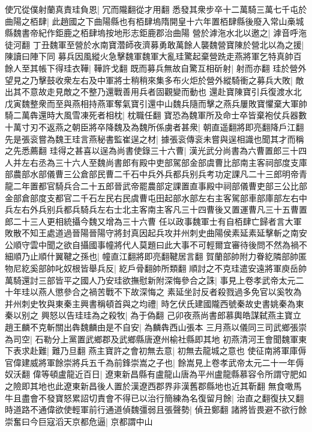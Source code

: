 使冗從僕射蘭真責珪負恩|{
	冗而隴翻從才用翻}
悉發其衆步卒十二萬騎三萬七千屯於曲陽之栢肆|{
	此趙國之下曲陽縣也有栢肆塢隋開皇十六年置栢肆縣後廢入常山槀城縣魏書帝紀作鉅鹿之栢肆塢按地形志鉅鹿郡治曲陽}
營於滹沲水北以邀之|{
	滹音呼沲徒河翻}
丁丑魏軍至營於水南寶濳師夜濟募勇敢萬餘人襲魏營寶陳於營北以為之援|{
	陳讀曰陣下同}
募兵因風縱火急擊魏軍魏軍大亂珪驚起棄營跣走燕將軍乞特真帥百餘人至其帳下得珪衣鞾|{
	鞾許戈翻}
既而募兵無故自驚互相斫射|{
	射而亦翻}
珪於營外望見之乃擊鼓收衆左右及中軍將士稍稍來集多布火炬於營外縱騎衝之募兵大敗|{
	敵出其不意故走見敵之不整乃還戰善用兵者固觀變而動也}
還赴寶陳寶引兵復渡水北戊寅魏整衆而至與燕相持燕軍奪氣寶引還中山魏兵隨而擊之燕兵屢敗寶懼棄大軍帥騎二萬犇還時大風雪凍死者相枕|{
	枕職任翻}
寶恐為魏軍所及命士卒皆棄袍仗兵器數十萬寸刃不返燕之朝臣將卒降魏及為魏所係虜者甚衆|{
	朝直遥翻將即亮翻降戶江翻}
先是張衮嘗為魏王珪言燕秘書監崔逞之材|{
	據張衮傳衮未嘗與逞相識也聞其才而稱之先悉薦翻}
珪得之甚喜以逞為尚書使錄三十六曹|{
	漢光武分尚書為六曹置郎三十四人并左右丞為三十六人至魏尚書郎有殿中吏部駕部金部虞曹比部南主客祠部度支庫部農部水部儀曹三公倉部民曹二千石中兵外兵都兵别兵考功定課凡二十三郎明帝青龍二年置都官騎兵合二十五郎晉武帝罷農部定課置直事殿中祠部儀曹吏部三公比部金部倉部度支都官二千石左民右民虞曹屯田起部水部左右主客駕部車部庫部左右中兵左右外兵别兵都兵騎兵左右士北主客南主客凡三十四曹後又置運曹凡三十五曹置郎二十三人更相統攝今魏又增為三十六曹}
任以政事魏軍士有自栢肆亡歸者言大軍敗散不知王處道過晉陽晉陽守將封真因起兵攻并州刺史曲陽侯素延素延擊斬之南安公順守雲中聞之欲自攝國事幢將代人莫題曰此大事不可輕爾宜審待後問不然為禍不細順乃止順什翼鞬之孫也|{
	幢直江翻將即亮翻鞬居言翻}
賀蘭部帥附力眷紇隣部帥匿物尼紇奚部帥叱奴根皆舉兵反|{
	紇戶骨翻帥所類翻}
順討之不克珪遣安遠將軍庾岳帥萬騎還討三部皆平之國人乃安珪欲撫慰新附深悔參合之誅|{
	事見上卷孝武帝太元二十年珪以燕人懲參合之禍苦戰不下故深悔之}
素延坐討反者殺戮過多免官以奚牧為并州刺史牧與東秦主興書稱頓首與之均禮|{
	時乞伏氏建國隴西號秦故史書姚秦為東秦以别之}
興怒以告珪珪為之殺牧|{
	為于偽翻}
己卯夜燕尚書郎慕輿皓謀弑燕主寶立趙王麟不克斬關出犇魏麟由是不自安|{
	為麟犇西山張本}
三月燕以儀同三司武鄉張崇為司空|{
	石勒分上黨置武鄉郡及武鄉縣唐遼州榆社縣即其地}
初燕清河王會聞魏軍東下表求赴難|{
	難乃旦翻}
燕主寶許之會初無去意|{
	初無去龍城之意也}
使征南將軍庫傉官偉建威將軍餘崇將兵五千為前鋒崇嵩之子也|{
	餘嵩見上卷孝武帝太元二十一年傉奴沃翻}
偉等頓盧龍近百日|{
	遼東新昌縣有盧龍山唐為平州盧龍縣慕容令所謂守肥如之險即其地也此遼東新昌後人置於漢遼西郡界非漢舊郡縣地也近其靳翻}
無食噉馬牛且盡會不發寶怒累詔切責會不得已以治行簡練為名復留月餘|{
	治直之翻復扶又翻}
時道路不通偉欲使輕軍前行通道偵魏彊弱且張聲勢|{
	偵丑鄭翻}
諸將皆畏避不欲行餘崇奮曰今巨寇滔天京都危逼|{
	京都謂中山}
